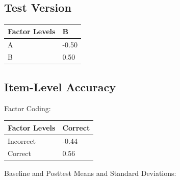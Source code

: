 \documentclass[
  letterpaper,
  DIV=11,
  numbers=noendperiod]{scrreprt}
\begin{document}
\subsection{Test Version}\label{test-version}

\begin{longtable}[]{@{}ll@{}}
\toprule\noalign{}
Factor Levels & B \\
\midrule\noalign{}
\endhead
\bottomrule\noalign{}
\endlastfoot
A & -0.50 \\
B & 0.50 \\
\end{longtable}

\subsection{Item-Level Accuracy}\label{item-level-accuracy}

Factor Coding:

\begin{longtable}[]{@{}ll@{}}
\toprule\noalign{}
Factor Levels & Correct \\
\midrule\noalign{}
\endhead
\bottomrule\noalign{}
\endlastfoot
Incorrect & -0.44 \\
Correct & 0.56 \\
\end{longtable}

Baseline and Posttest Means and Standard Deviations:
\end{document}
